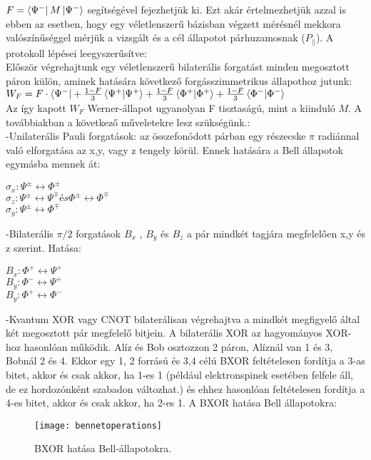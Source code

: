 $ F= \bra{\Psi^-}M\ket{\Psi^-} $ 
segítségével fejezhetjük ki. Ezt akár értelmezhetjük azzal is ebben az esetben, hogy egy véletlenszerű bázisban végzett mérésnél mekkora valószínűséggel mérjük a vizsgált és a cél állapotot párhuzamosnak ($P_{||}$).
A protokoll lépései leegyszerűsítve:\\
Először végrehajtunk egy véletlenszerű bilaterális forgatást minden megosztott páron külön, aminek hatására következő forgásszimmetrikus állapothoz jutunk:\\
$ W_F = F \cdot \bra{\Psi^-} + \frac{1-F}{3}\bra{\Psi^+}\ket{\Psi^+} + \frac{1-F}{3}\bra{\Phi^+}\ket{\Phi^+} + \frac{1-F}{3}\bra{\Phi^-}\ket{\Phi^-} $
\\
Az így kapott $W_F$  Werner-állapot ugyanolyan F tisztaságú, mint a kiinduló $M$. A továbbiakban a következő műveletekre lesz szükségünk.:\\
-Unilaterális Pauli forgatások: az összefonódott párban egy részecske  $\pi$ radiánnal való elforgatása az x,y, vagy z tengely körül. Ennek hatására a Bell állapotok egymásba mennek át: \\
\begin{center}
$\sigma_x : \Psi^\pm \leftrightarrow \Phi^\pm $\\
$\sigma_z : \Psi^\pm \leftrightarrow \Psi^\mp és \Phi^\pm \leftrightarrow \Phi^\mp $ \\
$\sigma_y : \Psi^\pm \leftrightarrow \Phi^\mp $
\end{center}
-Bilaterális $\pi/2$ forgatások $B_x$ , $B_y$ és $B_z$ a pár mindkét tagjára megfelelően x,y és z szerint. Hatása:\\
\begin{center}
$B_x : \Phi^+ \leftrightarrow \Psi^+$ \\
$B_y : \Phi^- \leftrightarrow \Psi^+$ \\
$B_y : \Phi^+ \leftrightarrow \Phi^-$
\end{center}
-Kvantum XOR vagy CNOT bilaterálisan végrehajtva a mindkét megfigyelő által két megosztott pár megfelelő bitjein. A bilaterális XOR az hagyományos XOR-hoz hasonlóan működik. Alíz és Bob osztozzon 2 páron, Alíznál van 1 és 3, Bobnál 2 és 4. Ekkor egy 1, 2  forrású és 3,4 célú BXOR feltételesen fordítja a 3-as bitet, akkor és csak akkor, ha 1-es 1 (például elektronspinek esetében felfele áll, de ez hordozónként szabadon változhat.) és ehhez hasonlóan feltételesen fordítja a 4-es bitet, akkor és csak akkor, ha 2-es 1. A BXOR hatása Bell állapotokra:\\
\begin{figure}[H]
\centering
\texttt{[image: bennetoperations]}
\caption[BXOR hatása Bell állapotokra]{BXOR hatása Bell-állapotokra.}
\end{figure}
